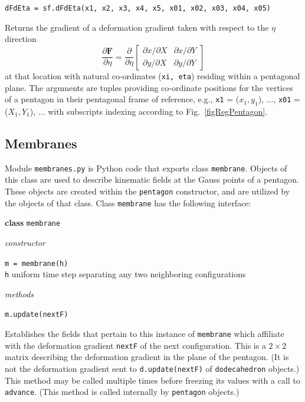 \medskip\noindent
\texttt{dFdEta = sf.dFdEta(x1, x2, x3, x4, x5, x01, x02, x03, x04, x05)}

\medskip\noindent
Returns the gradient of a deformation gradient taken with respect to the $\eta$ direction
\begin{displaymath}
\frac{\partial\mathbf{F}}{\partial \eta} = \frac{\partial}{\partial \eta} 
\begin{bmatrix}
\partial x / \partial X & \partial x / \partial Y \\
\partial y / \partial X & \partial y / \partial Y
\end{bmatrix}
\end{displaymath}
at that location with natural co-ordinates (\texttt{xi, eta}) residing within a pentagonal plane.  The arguments are tuples providing co-ordinate positions for the vertices of a pentagon in their pentagonal frame of reference, e.g., \texttt{x1} = ($x_1, y_1$), $\ldots$, \texttt{x01} = ($X_1, Y_1$), $\ldots$ with subscripts indexing according to Fig.~\ref{figRegPentagon}.


\subsection{Membranes}
\label{appMembranes}

Module \texttt{membranes.py} is Python code that exports class \texttt{membrane}.  Objects of this class are used to describe kinematic fields at the Gauss points of a pentagon.  These objects are created within the \texttt{pentagon} constructor, and are utilized by the objects of that class.  Class \texttt{membrane} has the following interface:

\medskip\noindent
\textbf{class} \texttt{membrane}

\medskip\noindent
\textit{constructor}

\medskip\noindent
\texttt{m = membrane(h)} \\
\indent \texttt{h} \;\; uniform time step separating any two neighboring configurations

\medskip\noindent
\textit{methods}

\medskip\noindent
\texttt{m.update(nextF)}
\medskip\noindent

Establishes the fields that pertain to this instance of \texttt{membrane} which affiliate with the deformation gradient \texttt{nextF} of the next configuration.  This is a $2 \times 2$ matrix describing the deformation gradient in the plane of the pentagon.  (It is not the deformation gradient sent to \texttt{d.update(nextF)} of \texttt{dodecahedron} objects.)  This method may be called multiple times before freezing its values with a call to \texttt{advance}.  (This method is called internally by \texttt{pentagon} objects.)

